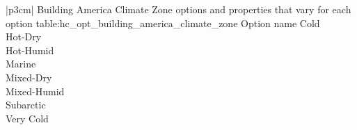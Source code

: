 \begin{customLongTable}{ |p{3cm}| }
{Building America Climate Zone options and properties that vary for each option} {table:hc_opt_building_america_climate_zone}
{Option name}
Cold \\ \hline
Hot-Dry \\ \hline
Hot-Humid \\ \hline
Marine \\ \hline
Mixed-Dry \\ \hline
Mixed-Humid \\ \hline
Subarctic \\ \hline
Very Cold \\
\end{customLongTable}
